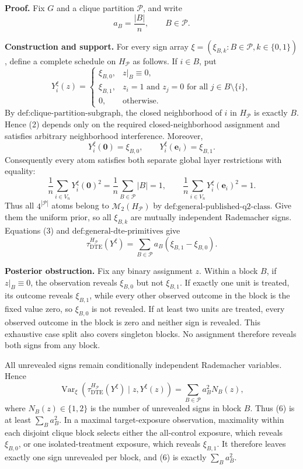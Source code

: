 \textbf{Proof.}
Fix \(G\) and a clique partition \(\mathcal P\), and write
\[
a_B=\frac{|B|}{n},\qquad B\in\mathcal P.
\tag{1}
\]

\textbf{Construction and support.}
For every sign array \(\xi=(\xi_{B,k}:B\in\mathcal P,k\in\{0,1\})\), define a complete schedule on \(H_{\mathcal P}\) as follows.  If \(i\in B\), put
\[
Y_i^{\xi}(z)=
\begin{cases}
\xi_{B,0},&z|_B\equiv0,\\
\xi_{B,1},&z_i=1\text{ and }z_j=0\text{ for all }j\in B\setminus\{i\},\\
0,&\text{otherwise}.
\end{cases}
\tag{2}
\]
By \(\text{def:clique-partition-subgraph}\), the closed neighborhood of \(i\) in \(H_{\mathcal P}\) is exactly \(B\).  Hence (2) depends only on the required closed-neighborhood assignment and satisfies arbitrary neighborhood interference.  Moreover,
\[
Y_i^{\xi}(\mathbf0)=\xi_{B,0},
\qquad
Y_i^{\xi}(\mathbf e_i)=\xi_{B,1}.
\tag{3}
\]
Consequently every atom satisfies both separate global layer restrictions with equality:
\[
\frac1n\sum_{i\in V_n}Y_i^{\xi}(\mathbf0)^2
=\frac1n\sum_{B\in\mathcal P}|B|=1,
\qquad
\frac1n\sum_{i\in V_n}Y_i^{\xi}(\mathbf e_i)^2=1.
\tag{4}
\]
Thus all \(4^{|\mathcal P|}\) atoms belong to \(\mathcal M_2(H_{\mathcal P})\) by \(\text{def:general-published-q2-class}\).  Give them the uniform prior, so all \(\xi_{B,k}\) are mutually independent Rademacher signs.  Equations (3) and \(\text{def:general-dte-primitives}\) give
\[
\tau_{\mathrm{DTE}}^{H_{\mathcal P}}(Y^{\xi})
=\sum_{B\in\mathcal P}a_B(\xi_{B,1}-\xi_{B,0}).
\tag{5}
\]

\textbf{Posterior obstruction.}
Fix any binary assignment \(z\).  Within a block \(B\), if \(z|_B\equiv0\), the observation reveals \(\xi_{B,0}\) but not \(\xi_{B,1}\).  If exactly one unit is treated, its outcome reveals \(\xi_{B,1}\), while every other observed outcome in the block is the fixed value zero, so \(\xi_{B,0}\) is not revealed.  If at least two units are treated, every observed outcome in the block is zero and neither sign is revealed.  This exhaustive case split also covers singleton blocks.  No assignment therefore reveals both signs from any block.

All unrevealed signs remain conditionally independent Rademacher variables.  Hence
\[
\operatorname{Var}_{\xi}\!\left(
\tau_{\mathrm{DTE}}^{H_{\mathcal P}}(Y^{\xi})
\mid z,Y^{\xi}(z)
\right)
=\sum_{B\in\mathcal P}a_B^2N_B(z),
\tag{6}
\]
where \(N_B(z)\in\{1,2\}\) is the number of unrevealed signs in block \(B\).  Thus (6) is at least \(\sum_Ba_B^2\).  In a maximal target-exposure observation, maximality within each disjoint clique block selects either the all-control exposure, which reveals \(\xi_{B,0}\), or one isolated-treatment exposure, which reveals \(\xi_{B,1}\).  It therefore leaves exactly one sign unrevealed per block, and (6) is exactly \(\sum_Ba_B^2\).

